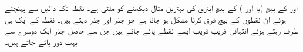  اور  کے بیچ (یا  اور 
) کے بیچ ابتری کی بہترین مثال دیکھنے کو ملتی ہے۔ نقطہ  تک دائیں سے پہنچتے ہوئے ان نقطوں کے بیچ فرق کرنا مشکل ہو جاتا ہے جو جذر  اور جذر  دیتے ہیں۔ نقطہ  کے ایک ہی طرف رہتے ہوئے  انتہائی قریب قریب ایسے نقطے پائے جاتے ہیں جن سے حاصل جذر ایک دوسرے سے بہت دور پائے جاتے ہیں۔

